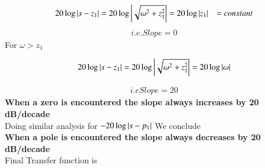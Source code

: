 \begin{enumerate}[label=\thesection.\arabic*.,ref=\thesection.\theenumi]
\begin{align}
	20\log \left\vert s-z_{1}\right\vert = 20\log \left\vert\sqrt{\omega^{2} + z_{1}^{2}}\right\vert 
	&= 20 \log \left\vert z_{1}\right\vert 
	&= constant 
\end{align}  
\begin{align}
	i.e. Slope = 0
\end{align}
For $\omega > z_{1}$

\begin{align}
	20\log \left\vert s-z_{1}\right\vert = 20\log \left\vert\sqrt{\omega^{2} + z_{1}^{2}}\right\vert = 20 \log \left\vert\omega\right\vert 
\end{align}

\begin{align}
	i.e Slope = 20 
\end{align}
\textbf{When a zero is encountered the slope always increases by 20 dB/decade}
\\
Doing similar analysis for $ - 20\log \left\vert s-p_{1}\right\vert $  We conclude
\\
\textbf{When a pole is encountered the slope always decreases by 20 dB/decade}
\\


Final Transfer function is


\end{enumerate}
